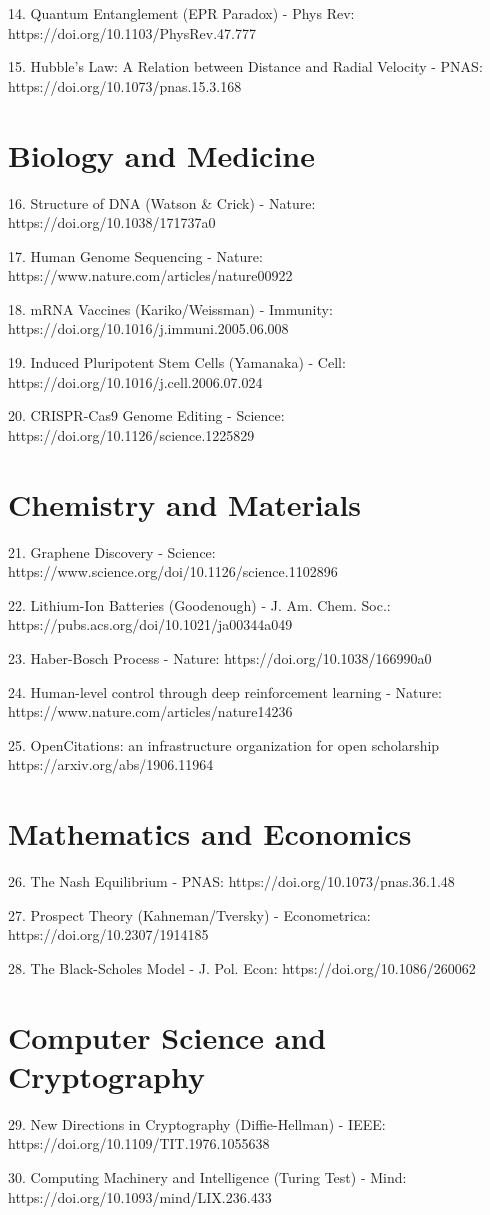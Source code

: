 \documentclass[12pt]{article}
\begin{document}
14. Quantum Entanglement (EPR Paradox) - Phys Rev: https://doi.org/10.1103/PhysRev.47.777

15. Hubble's Law: A Relation between Distance and Radial Velocity - PNAS: https://doi.org/10.1073/pnas.15.3.168

\section{Biology and Medicine}
16. Structure of DNA (Watson & Crick) - Nature: https://doi.org/10.1038/171737a0

17. Human Genome Sequencing - Nature: https://www.nature.com/articles/nature00922

18. mRNA Vaccines (Kariko/Weissman) - Immunity: https://doi.org/10.1016/j.immuni.2005.06.008

19. Induced Pluripotent Stem Cells (Yamanaka) - Cell: https://doi.org/10.1016/j.cell.2006.07.024

20. CRISPR-Cas9 Genome Editing - Science: https://doi.org/10.1126/science.1225829

\section{Chemistry and Materials}
21. Graphene Discovery - Science: https://www.science.org/doi/10.1126/science.1102896

22. Lithium-Ion Batteries (Goodenough) - J. Am. Chem. Soc.: https://pubs.acs.org/doi/10.1021/ja00344a049

23. Haber-Bosch Process - Nature: https://doi.org/10.1038/166990a0

24. Human-level control through deep reinforcement learning - Nature: https://www.nature.com/articles/nature14236

25. OpenCitations: an infrastructure organization for open scholarship  https://arxiv.org/abs/1906.11964

\section{Mathematics and Economics}
26. The Nash Equilibrium - PNAS: https://doi.org/10.1073/pnas.36.1.48

27. Prospect Theory (Kahneman/Tversky) - Econometrica: https://doi.org/10.2307/1914185

28. The Black-Scholes Model - J. Pol. Econ: https://doi.org/10.1086/260062

\section{Computer Science and Cryptography}
29. New Directions in Cryptography (Diffie-Hellman) - IEEE: https://doi.org/10.1109/TIT.1976.1055638

30. Computing Machinery and Intelligence (Turing Test) - Mind: https://doi.org/10.1093/mind/LIX.236.433
\end{document}
